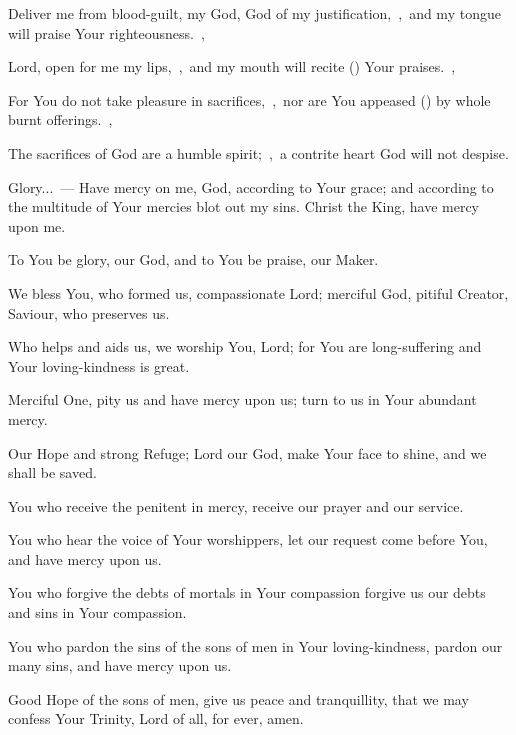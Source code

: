 \documentclass[12pt,twoside,a5paper]{article}
\begin{document}
\begin{halfparskip}
  Deliver me from blood-guilt, my God, God of my justification,~\sep\ and my tongue will praise Your righteousness.~\sep

  Lord, open for me my lips,~\sep\ and my mouth will recite () Your praises.~\sep

  For You do not take pleasure in sacrifices,~\sep\ nor are You appeased () by whole burnt offerings.~\sep

  The sacrifices of God are a humble spirit;~\sep\ a contrite heart God will not despise.

  Glory...~---  Have mercy on me, God, according to Your grace; and according to the multitude of Your mercies blot out my sins. Christ the King, have mercy upon me.
\end{halfparskip}



\begin{halfparskip}

  To You be glory, our God, and to You be praise, our Maker.

  We bless You, who formed us, compassionate Lord; merciful God, pitiful Creator, Saviour, who preserves us.

  Who helps and aids us, we worship You, Lord; for You are long-suffering and Your loving-kindness is great.

  Merciful One, pity us and have mercy upon us; turn to us in Your abundant mercy.

  Our Hope and strong Refuge; Lord our God, make Your face to shine, and we shall be saved.

  You who receive the penitent in mercy, receive our prayer and our service.

  You who hear the voice of Your worshippers, let our request come before You, and have mercy upon us.

  You who forgive the debts of mortals in Your compassion forgive us our debts and sins in Your compassion.

  You who pardon the sins of the sons of men in Your loving-kindness, pardon our many sins, and have mercy upon us.

  Good Hope of the sons of men, give us peace and tranquillity, that we may confess Your Trinity, Lord of all, for ever, amen. 
\end{halfparskip}
\end{document}
